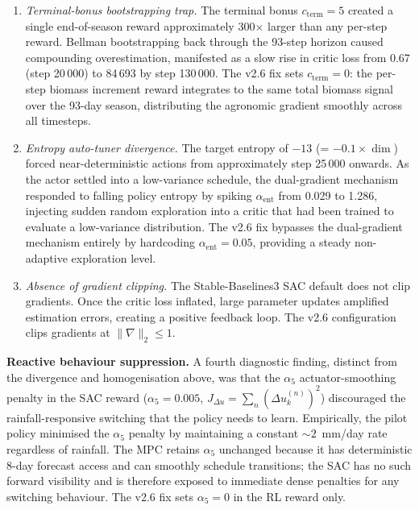 \begin{enumerate}
  \item \emph{Terminal-bonus bootstrapping trap.} The terminal bonus
        $c_{\mathrm{term}} = 5$ created a single end-of-season reward approximately
        300$\times$ larger than any per-step reward. Bellman bootstrapping back
        through the 93-step horizon caused compounding overestimation, manifested as
        a slow rise in critic loss from 0.67 (step 20\,000) to 84\,693 by step
        130\,000. The v2.6 fix sets $c_{\mathrm{term}} = 0$: the per-step biomass
        increment reward integrates to the same total biomass signal over the
        93-day season, distributing the agronomic gradient smoothly across all
        timesteps.

  \item \emph{Entropy auto-tuner divergence.} The target entropy of $-13$
        (= $-0.1 \times \dim$) forced near-deterministic actions from
        approximately step 25\,000 onwards. As the actor settled into a
        low-variance schedule, the dual-gradient mechanism responded to falling
        policy entropy by spiking $\alpha_{\mathrm{ent}}$ from 0.029 to 1.286,
        injecting sudden random exploration into a critic that had been trained
        to evaluate a low-variance distribution. The v2.6 fix bypasses the
        dual-gradient mechanism entirely by hardcoding $\alpha_{\mathrm{ent}} = 0.05$,
        providing a steady non-adaptive exploration level.

  \item \emph{Absence of gradient clipping.} The Stable-Baselines3 SAC default
        does not clip gradients. Once the critic loss inflated, large parameter
        updates amplified estimation errors, creating a positive feedback loop.
        The v2.6 configuration clips gradients at $\|\nabla\|_2 \le 1$.
\end{enumerate}

\textbf{Reactive behaviour suppression.}
A fourth diagnostic finding, distinct from the divergence and homogenisation
above, was that the $\alpha_5$ actuator-smoothing penalty in the SAC reward
($\alpha_5 = 0.005$, $J_{\Delta u} = \sum_n (\Delta u_k^{(n)})^2$) discouraged
the rainfall-responsive switching that the policy needs to learn. Empirically,
the pilot policy minimised the $\alpha_5$ penalty by maintaining a constant
$\sim 2$~mm/day rate regardless of rainfall. The MPC retains $\alpha_5$
unchanged because it has deterministic 8-day forecast access and can smoothly
schedule transitions; the SAC has no such forward visibility and is therefore
exposed to immediate dense penalties for any switching behaviour. The v2.6 fix
sets $\alpha_5 = 0$ in the RL reward only.

